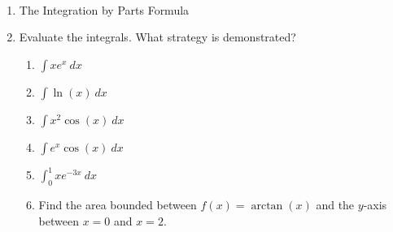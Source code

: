 \documentclass[11pt,fleqn]{article}
\begin{document}
\renewcommand{\headrulewidth}{0pt}
\newcommand{\blank}[1]{\rule{#1}{0.75pt}}
\newcommand{\bc}{\begin{center}}
\newcommand{\ec}{\end{center}}
\renewcommand{\d}{\displaystyle}

\vspace*{-0.7in}

\begin{center}
  \large
  \\
   
\end{center}

\begin{enumerate}
\item The Integration by Parts Formula
\vspace{3in}

\item Evaluate the integrals. What strategy is demonstrated?
	\begin{enumerate}
	\item $\displaystyle \int xe^x \: dx$
	\vfill
	\item $\displaystyle \int \ln(x) \: dx$
	\vfill
	\item $\displaystyle \int x^2\cos(x) \: dx$
	\vfill
	\newpage
	\item $\displaystyle \int e^x\cos(x) \: dx$
	\vfill
	\item $\displaystyle \int_0^1 xe^{-3x} \: dx$
	\vfill
	\item Find the area bounded between $f(x)=\arctan(x)$ and the $y$-axis between $x=0$ and $x=2.$
	\vfill
	\end{enumerate}
\end{enumerate}
\end{document}
